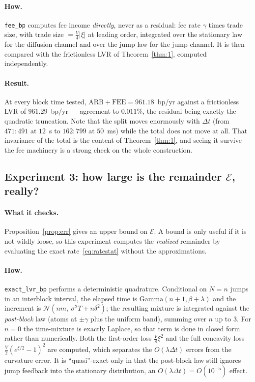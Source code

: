 \documentclass[11pt]{article}
\theoremstyle{definition}
\theoremstyle{remark}
\newcommand{\dt}{\Delta t}
\newcommand{\1}{\mathbf{1}}
\begin{document}
\paragraph{How.} \texttt{fee\_bp} computes fee income \emph{directly}, never as a residual: fee rate $\gamma$ times trade size, with trade size $= \tfrac{V}{4}|\xi|$ at leading order, integrated over the stationary law for the diffusion channel and over the jump law for the jump channel. It is then compared with the frictionless LVR of Theorem~\ref{thm:1}, computed independently.

\paragraph{Result.} At every block time tested, $\mathrm{ARB} + \mathrm{FEE} = 961.18$~bp/yr against a frictionless LVR of $961.29$~bp/yr --- agreement to $0.011\%$, the residual being exactly the quadratic truncation. Note that the split moves enormously with $\dt$ (from $471{:}491$ at $12$~s to $162{:}799$ at $50$~ms) while the total does not move at all. That invariance of the total is the content of Theorem~\ref{thm:1}, and seeing it survive the fee machinery is a strong check on the whole construction.

\subsection{Experiment 3: how large is the remainder \texorpdfstring{$\mathcal E$}{E}, really?}\label{sec:expquad}

\paragraph{What it checks.} Proposition~\ref{prop:err} gives an upper bound on $\mathcal E$. A bound is only useful if it is not wildly loose, so this experiment computes the \emph{realized} remainder by evaluating the exact rate~\eqref{eq:ratestat} without the approximations.

\paragraph{How.} \texttt{exact\_lvr\_bp} performs a deterministic quadrature. Conditional on $N = n$ jumps in an interblock interval, the elapsed time is $\mathrm{Gamma}(n+1, \beta+\lambda)$ and the increment is $\mathcal N(nm,\ \sigma^2T + n\delta^2)$; the resulting mixture is integrated against the \emph{post-block} law (atoms at $\pm\gamma$ plus the uniform band), summing over $n$ up to $3$. For $n = 0$ the time-mixture is exactly Laplace, so that term is done in closed form rather than numerically. Both the first-order loss $\tfrac{V}{8}\xi^2$ and the full concavity loss $\tfrac{V}{2}(e^{\xi/2}-1)^2$ are computed, which separates the $O(\lambda\dt)$ errors from the curvature error. It is ``quasi''-exact only in that the post-block law still ignores jump feedback into the stationary distribution, an $O(\lambda\dt) = O(10^{-5})$ effect.
\end{document}

